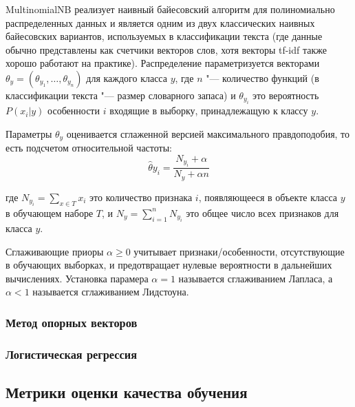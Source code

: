 \documentclass[bachelor, och, coursework]{SCWorks}
\begin{document}
            MultinomialNB реализует наивный байесовский алгоритм для
            полиномиально распределенных данных и является одним из двух
            классических наивных байесовских вариантов, используемых в
            классификации текста (где данные обычно представлены как счетчики
            векторов слов, хотя векторы tf-idf также хорошо работают на
            практике). Распределение параметризуется векторами $\theta_y =
            (\theta_{y_1}, \dots, \theta_{y_n})$ для каждого класса $y$, где $n$
            "--- количество функций (в классификации текста "--- размер
            словарного запаса) и $\theta_{y_i}$ это вероятность $P(x_i | y)$
            особенности $i$ входящие в выборку, принадлежащую к классу $y$.

            Параметры $\theta_y$ оценивается сглаженной версией максимального
            правдоподобия, то есть подсчетом относительной частоты:
            $$\hat{\theta}{y_i} = \frac{N_{y_i} + \alpha}{N_y + \alpha n}$$

            где $N_{y_i} = \sum_{x \in T} x_i$ это количество признака $i$,
            появляющееся в объекте класса $y$ в обучающем наборе $T$, и $N_y =
            \sum_{i = 1}^{n} N_{y_i}$ это общее число всех признаков для класса
            $y$.

            Сглаживающие приоры $\alpha \geq 0$ учитывает признаки/особенности,
            отсутствующие в обучающих выборках, и предотвращает нулевые
            вероятности в дальнейших вычислениях. Установка парамера $\alpha =
            1$ называется сглаживанием Лапласа, а $\alpha < 1$ называется
            сглаживанием Лидстоуна.

        \subsubsection{Метод опорных векторов}


            

        \subsubsection{Логистическая регрессия}

    \subsection{Метрики оценки качества обучения}
\end{document}
